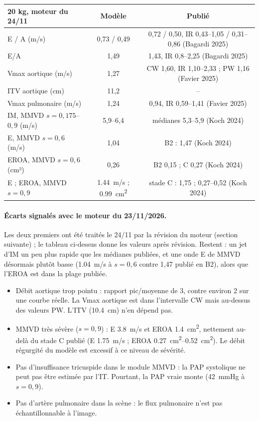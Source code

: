 \documentclass[10pt,a4paper]{article}
\begin{document}
\begin{tabularx}{\linewidth}{@{}Xcc@{}}
\toprule
20 kg, moteur du 24/11 & Modèle & Publié\\\midrule
E / A (m/s) & 0,73 / 0,49 & 0,72 / 0,50, IR 0,43--1,05 / 0,31--0,86 (Bagardi 2025)\\
E/A & 1,49 & 1,43, IR 0,8--2,25 (Bagardi 2025)\\
Vmax aortique (m/s) & 1,27 & CW 1,60, IR 1,10--2,33 ; PW 1,16 (Favier 2025)\\
ITV aortique (cm) & 11,2 & --\\
Vmax pulmonaire (m/s) & 1,24 & 0,94, IR 0,59--1,41 (Favier 2025)\\
IM, MMVD $s = 0{,}175$--$0{,}9$ (m/s) & 5,9--6,4 & médianes 5,3--5,9 (Koch 2024)\\
E, MMVD $s=0{,}6$ (m/s) & 1,04 & B2 : 1,47 (Koch 2024)\\
EROA, MMVD $s=0{,}6$ (cm²) & 0,26 & B2 0,15 ; C 0,27 (Koch 2024)\\
E ; EROA, MMVD $s=0{,}9$ & \SI{1,44}{m/s} ; \SI{0,99}{cm^2} & stade C : 1,75 ; 0,27--0,52 (Koch 2024)\\
\bottomrule
\end{tabularx}

\paragraph{Écarts signalés avec le moteur du 23/11/2026.} Les deux premiers ont été traités le 24/11 par la révision du
moteur (section suivante) ; le tableau ci-dessus donne les valeurs après révision. Restent : un jet d'IM un peu plus rapide
que les médianes publiées, et une onde E de MMVD désormais plutôt basse (\SI{1,04}{m/s} à $s=0{,}6$ contre 1,47 publié en
B2), alors que l'EROA est dans la plage publiée.
\begin{itemize}
\item Débit aortique trop pointu : rapport pic/moyenne de 3, contre environ 2 sur une courbe réelle. La Vmax aortique est
dans l'intervalle CW mais au-dessus des valeurs PW. L'ITV (\SI{10,4}{cm}) n'en dépend pas.
\item MMVD très sévère ($s=0{,}9$) : E \SI{3,8}{m/s} et EROA \SI{1,4}{cm^2}, nettement au-delà du stade C publié
(E \SI{1,75}{m/s} ; EROA \SIrange{0,27}{0,52}{cm^2}). Le débit régurgité du modèle est excessif à ce niveau de sévérité.
\item Pas d'insuffisance tricuspide dans le module MMVD : la PAP systolique ne peut pas être estimée par l'IT. Pourtant,
la PAP vraie monte (\SI{42}{mmHg} à $s=0{,}9$).
\item Pas d'artère pulmonaire dans la scène : le flux pulmonaire n'est pas échantillonnable à l'image.
\end{itemize}
\end{document}
